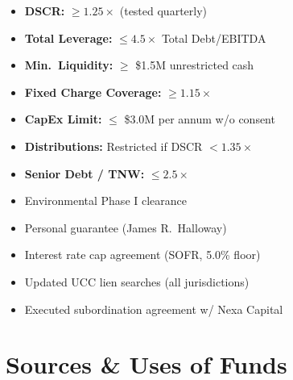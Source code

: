 \documentclass[11pt,a4paper]{article}
\begin{document}
\begin{minipage}[t]{0.47\textwidth}
  \vspace{0pt}
  \begin{tcolorbox}[creditbox, title={\faTasks\enspace Financial Covenants}]
    \small
    \begin{itemize}[leftmargin=14pt, itemsep=3pt, topsep=2pt]
      \item \textbf{DSCR:} $\geq 1.25\times$ (tested quarterly)
      \item \textbf{Total Leverage:} $\leq 4.5\times$ Total Debt/EBITDA
      \item \textbf{Min.\ Liquidity:} $\geq$ \$1.5M unrestricted cash
      \item \textbf{Fixed Charge Coverage:} $\geq 1.15\times$
      \item \textbf{CapEx Limit:} $\leq$ \$3.0M per annum w/o consent
      \item \textbf{Distributions:} Restricted if DSCR $< 1.35\times$
      \item \textbf{Senior Debt / TNW:} $\leq 2.5\times$
    \end{itemize}
  \end{tcolorbox}

  \par\vspace{2mm}

  \begin{tcolorbox}[goldbox, title={\faClipboardList\enspace Conditions Precedent}]
    \small
    \begin{itemize}[leftmargin=14pt, itemsep=3pt, topsep=2pt]
      \item Environmental Phase I clearance
      \item Personal guarantee (James R.\ Halloway)
      \item Interest rate cap agreement (SOFR, 5.0\% floor)
      \item Updated UCC lien searches (all jurisdictions)
      \item Executed subordination agreement w/ Nexa Capital
    \end{itemize}
  \end{tcolorbox}
\end{minipage}

\par
\vspace{6mm}

\section{Sources \& Uses of Funds}
\end{document}
